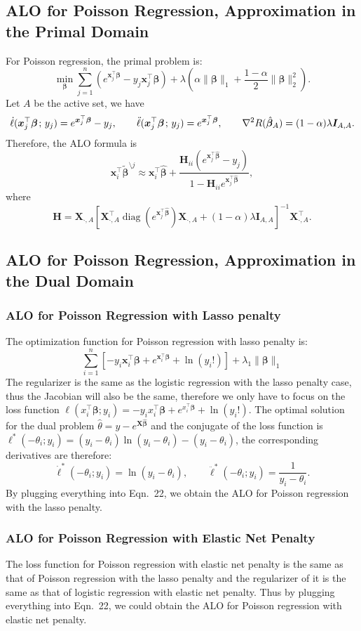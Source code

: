 \documentclass[11pt]{article}
\newcommand{\bx}{\bm{x}}
\newcommand{\bH}{\bm{H}}
\newcommand{\bI}{\bm{I}}
\newcommand{\bX}{\bm{X}}
\newcommand{\bbeta}{\bm{\beta}}
\newcommand{\semicol}{\nobreak\mskip2mu\mathpunct{}\nonscript\mkern-\thinmuskip{;}\mskip6muplus1mu\relax}
\DeclareMathOperator{\diag}{diag}
\newcommand{\refthm}[2]{#1~#2}
\begin{document}
\subsection{ALO for Poisson Regression, Approximation in the Primal Domain}
For Poisson regression, the primal problem is: \[\min_{\bbeta}\sum_{j=1}^{n}\left(e^{\bx_j^\top\bbeta}-y_j\bx_j^\top\bbeta\right)+\lambda\left(\alpha\|\bbeta\|_1+\frac{1-\alpha}{2}\|\bbeta\|_2^2\right).\] Let \(A\) be the active set, we have \[\dot{\ell}(\bx_j^\top\bbeta\semicol y_j)=e^{\bx_j^\top\bbeta}-y_j,\qquad\ddot{\ell}(\bx_j^\top\bbeta\semicol y_j)=e^{\bx_j^\top\bbeta},\qquad\nabla^2 R(\hat{\bbeta}_A)=(1-\alpha)\lambda\bI_{A,A}.\] Therefore, the ALO formula is \[\bx_i^\top\tilde{\bbeta}^{\setminus j}\approx\bx_i^\top\hat{\bbeta}+\frac{\bH_{ii}\left(e^{\bx_j^\top\hat{\bbeta}}-y_j\right)}{1-\bH_{ii}e^{\bx_j^\top\hat{\bbeta}}},\] where \[\bH=\bX_{\cdot,A}\left[\bX_{\cdot,A}^\top\diag\left(e^{\bx_j^\top\hat{\bbeta}}\right)\bX_{\cdot,A}+(1-\alpha)\lambda\bI_{A,A}\right]^{-1}\bX_{\cdot,A}^\top.\]

\subsection{ALO for Poisson Regression, Approximation in the Dual Domain}
\subsubsection{ALO for Poisson Regression with Lasso penalty}
The optimization function for Poisson regression with lasso penalty is: \[\sum_{i=1}^n\left[-y_{i}\bx_{i}^{\top}\bbeta+e^{\bx_{i}^{\top}\bbeta}+\ln(y_{i}!)\right] + \lambda_{1}\|\bbeta\|_{1}\] The regularizer is the same as the logistic regression with the lasso penalty case, thus the Jacobian will also be the same, therefore we only have to focus on the loss function $\ell(x_{i}^{\top}\bbeta ; y_{i}) = -y_{i}x_{i}^{\top}\bbeta+e^{x_{i}^{\top}\bbeta}+\ln(y_{i}!)$. The optimal solution for the dual problem $\hat{\theta} = y - e^{\bX\hat{\bbeta}}$ and the conjugate of the loss function is $\ell^{*}(-\theta_{i};y_{i}) = (y_{i}-\theta_{i})\ln(y_{i}-\theta_{i})-(y_{i}-\theta_{i})$, the corresponding derivatives are therefore: \[\dot{\ell}^{*}(-\theta_{i};y_{i}) = \ln(y_{i}-\theta_{i}),\qquad\ddot{\ell}^{*}(-\theta_{i};y_{i}) = \frac{1}{y_{i}-\theta_{i}}.\] By plugging everything into \refthm{Eqn.}{22}, we obtain the ALO for Poisson regression with the lasso penalty.

\subsubsection{ALO for Poisson Regression with Elastic Net Penalty}
The loss function for Poisson regression with elastic net penalty is the same as that of Poisson regression with the lasso penalty and the regularizer of it is the same as that of logistic regression with elastic net penalty. Thus by plugging everything into \refthm{Eqn.}{22}, we could obtain the ALO for Poisson regression with elastic net penalty.
\end{document}

